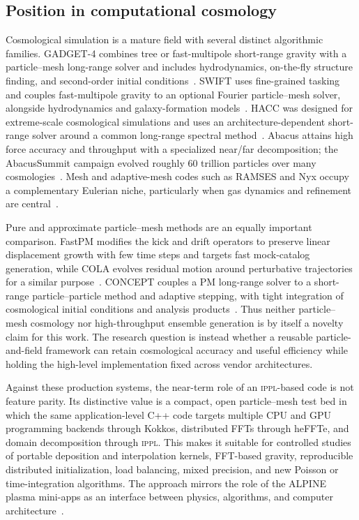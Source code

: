 \documentclass[11pt]{article}
\newcommand{\IPPL}{\textnormal{\textsc{ippl}}\xspace}
\begin{document}
\subsection*{Position in computational cosmology}

Cosmological simulation is a mature field with several distinct algorithmic
families.  GADGET-4 combines tree or fast-multipole short-range gravity with a
particle--mesh long-range solver and includes hydrodynamics, on-the-fly structure
finding, and second-order initial conditions~\cite{springel2021gadget4}.  SWIFT
uses fine-grained tasking and couples fast-multipole gravity to an optional
Fourier particle--mesh solver, alongside hydrodynamics and galaxy-formation
models~\cite{schaller2024swift}.  HACC was designed for extreme-scale
cosmological simulations and uses an architecture-dependent short-range solver
around a common long-range spectral method~\cite{habib2016hacc}.  Abacus attains
high force accuracy and throughput with a specialized near/far decomposition;
the AbacusSummit campaign evolved roughly 60 trillion particles over many
cosmologies~\cite{maksimova2021abacussummit}.  Mesh and adaptive-mesh codes such
as RAMSES and Nyx occupy a complementary Eulerian niche, particularly when gas
dynamics and refinement are central~\cite{teyssier2002ramses,almgren2013nyx}.

Pure and approximate particle--mesh methods are an equally important comparison.
FastPM modifies the kick and drift operators to preserve linear displacement
growth with few time steps and targets fast mock-catalog generation, while COLA
evolves residual motion around perturbative trajectories for a similar
purpose~\cite{feng2016fastpm,tassev2013cola}.  CONCEPT couples a PM long-range
solver to a short-range particle--particle method and adaptive stepping, with
tight integration of cosmological initial conditions and analysis
products~\cite{dakin2022concept}.  Thus neither particle--mesh cosmology nor
high-throughput ensemble generation is by itself a novelty claim for this work.
The research question is instead whether a reusable particle-and-field framework
can retain cosmological accuracy and useful efficiency while holding the
high-level implementation fixed across vendor architectures.

Against these production systems, the near-term role of an \IPPL-based code is
not feature parity.  Its distinctive value is a compact, open particle--mesh
test bed in which the same application-level C++ code targets multiple CPU and
GPU programming backends through Kokkos, distributed FFTs through heFFTe, and
domain decomposition through \IPPL.  This makes it suitable for controlled
studies of portable deposition and interpolation kernels, FFT-based gravity,
reproducible distributed initialization, load balancing, mixed precision, and
new Poisson or time-integration algorithms.  The approach mirrors the role of
the ALPINE plasma mini-apps as an interface between physics, algorithms, and
computer architecture~\cite{muralikrishnan2024scaling}.
\end{document}
